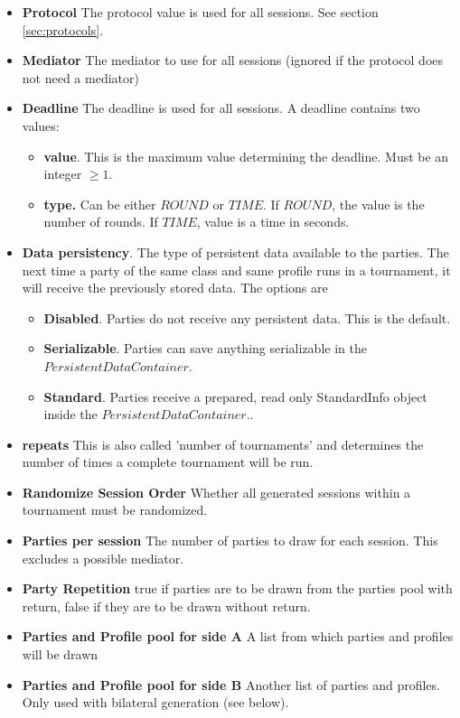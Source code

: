 \documentclass[]{article}
\begin{document}
\begin{itemize}
\item \textbf{Protocol} The protocol value is used for all sessions. See section \ref{sec:protocols}.
\item \textbf{Mediator} The mediator to use for all sessions (ignored if the protocol does not need a mediator)
\item \textbf{Deadline} The deadline is used for all sessions.  A deadline contains two values:
     \begin{itemize}
        \item \textbf{value}. This is the maximum value determining the deadline. Must be an integer $\ge 1$.
        \item \textbf{type.} Can be either $ROUND$ or $TIME$. If $ROUND$, the value is the number of rounds. If $TIME$, value is a time in seconds.
      \end{itemize}
\item \textbf{Data persistency}. The type of persistent data available to the parties. The next time a party of the same class and same profile runs in a tournament, it will receive the previously stored data. The options are 
	\begin{itemize}
	\item \textbf{Disabled}. Parties do not receive any persistent data. This is the default.
	\item \textbf{Serializable}. Parties can save anything serializable in the $PersistentDataContainer$.
	\item \textbf{Standard}. Parties receive a prepared, read only StandardInfo object inside the $PersistentDataContainer$.. 
	\end{itemize}
\item \textbf{repeats} This is also called 'number of tournaments' and determines the number of times a complete tournament will be run.
\item \textbf{Randomize Session Order} Whether all generated sessions within a tournament must be randomized.
\item \textbf{Parties per session} The number of parties to draw for each session. This excludes a possible mediator.
\item \textbf{Party Repetition} true if parties are to be drawn from the parties pool with return, false if they are to be drawn without return.
\item \textbf{Parties and Profile pool for side A}  A list from which parties and profiles will be drawn
\item \textbf{Parties and Profile pool for side B} Another list of parties and profiles. Only used with bilateral generation (see below).
\end{itemize}
\end{document}
